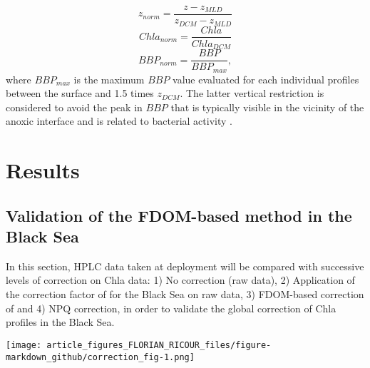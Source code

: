 \documentclass[journal abbreviation, manuscript]{copernicus}
\begin{document}
 \begin{equation}
z_{norm} = \frac{z - z_{MLD}}{z_{DCM} - z_{MLD}}    
\end{equation}
  \begin{equation}
  Chla_{norm} = \frac{Chla}{Chla_{DCM}} 
  \end{equation}
    \begin{equation}
BBP_{norm} = \frac{BBP}{BBP_{max}},
\end{equation}
where $BBP_{max}$ is the maximum $BBP$ value evaluated for each individual profiles between the surface and 1.5 times $z_{DCM}$. The latter vertical restriction is considered to avoid the peak in $BBP$ that is typically visible in the vicinity of the anoxic interface and is related to bacterial activity \citep{Karabashev1995}.
 

\section{Results}
\subsection{Validation of the FDOM-based method in the Black Sea}
\label{sec:validation}

In this section, HPLC data taken at deployment will be compared with successive levels of correction on Chla data: 1) No correction (raw data), 2) Application of the correction factor of \citet{Roesler2017} for the Black Sea on raw data, 3) FDOM-based correction of \citet{Xing2017} and 4) NPQ correction, in order to validate the global correction of Chla profiles in the Black Sea.

\begin{figure*}[h!] %
    \texttt{[image: article\_figures\_FLORIAN\_RICOUR\_files/figure-markdown\_github/correction\_fig-1.png]}
    \caption{Vertical Chla profiles obtained at the deployment of the float 6903240 on the 29/03/2018 at 49'N and 29\textdegree E, using different levels of correction. HPLC data are depicted in red squares and CDOM in black dots. Right panel: zoom in the surface layer.}
    \label{fig:deployment_profiles}
\end{figure*}
\end{document}
